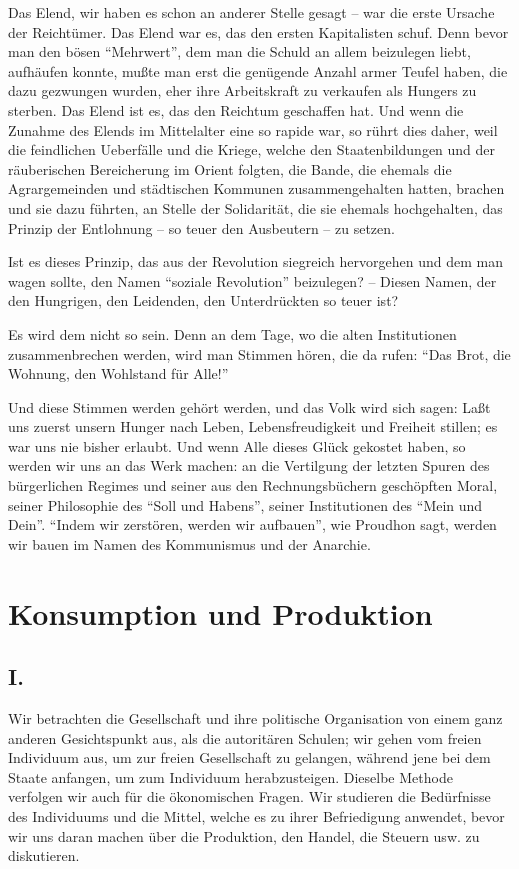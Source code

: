 \documentclass{scrbook}
\begin{document}
Das Elend, wir haben es schon an anderer Stelle gesagt – war die erste Ursache der Reichtümer. Das Elend war es, das den ersten Kapitalisten schuf. Denn bevor man den bösen ``Mehrwert'', dem man die Schuld an allem beizulegen liebt, aufhäufen konnte, mußte man erst die genügende Anzahl armer Teufel haben, die dazu gezwungen wurden, eher ihre Arbeitskraft zu verkaufen als Hungers zu sterben. Das Elend ist es, das den Reichtum geschaffen hat. Und wenn die Zunahme des Elends im Mittelalter eine so rapide war, so rührt dies daher, weil die feindlichen Ueberfälle und die Kriege, welche den Staatenbildungen und der räuberischen Bereicherung im Orient folgten, die Bande, die ehemals die Agrargemeinden und städtischen Kommunen zusammengehalten hatten, brachen und sie dazu führten, an Stelle der Solidarität, die sie ehemals hochgehalten, das Prinzip der Entlohnung – so teuer den Ausbeutern – zu setzen.

Ist es dieses Prinzip, das aus der Revolution siegreich hervorgehen und dem man wagen sollte, den Namen ``soziale Revolution'' beizulegen? – Diesen Namen, der den Hungrigen, den Leidenden, den Unterdrückten so teuer ist?

Es wird dem nicht so sein. Denn an dem Tage, wo die alten Institutionen zusammenbrechen werden, wird man Stimmen hören, die da rufen: ``Das Brot, die Wohnung, den Wohlstand für Alle!''

Und diese Stimmen werden gehört werden, und das Volk wird sich sagen: Laßt uns zuerst unsern Hunger nach Leben, Lebensfreudigkeit und Freiheit stillen; es war uns nie bisher erlaubt. Und wenn Alle dieses Glück gekostet haben, so werden wir uns an das Werk machen: an die Vertilgung der letzten Spuren des bürgerlichen Regimes und seiner aus den Rechnungsbüchern geschöpften Moral, seiner Philosophie des ``Soll und Habens'', seiner Institutionen des ``Mein und Dein''. ``Indem wir zerstören, werden wir aufbauen'', wie Proudhon sagt, werden wir bauen im Namen des Kommunismus und der Anarchie.

\chapter{Konsumption und Produktion}
\section*{I.}

Wir betrachten die Gesellschaft und ihre politische Organisation von einem ganz anderen Gesichtspunkt aus, als die autoritären Schulen; wir gehen vom freien Individuum aus, um zur freien Gesellschaft zu gelangen, während jene bei dem Staate anfangen, um zum Individuum herabzusteigen. Dieselbe Methode verfolgen wir auch für die ökonomischen Fragen. Wir studieren die Bedürfnisse des Individuums und die Mittel, welche es zu ihrer Befriedigung anwendet, bevor wir uns daran machen über die Produktion, den Handel, die Steuern usw. zu diskutieren.
\end{document}
